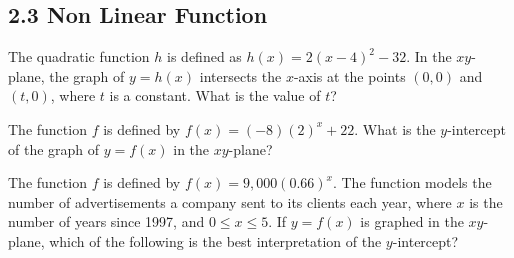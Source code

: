 \subsection*{2.3 Non Linear Function }

\vspace{0.5em}

\setcounter{questionnum}{0}

\noindent\markforreview
\vspace{1em}

The quadratic function $h$ is defined as $h(x) = 2(x - 4)^2 - 32$.  
In the $xy$-plane, the graph of $y = h(x)$ intersects the $x$-axis at the points $(0, 0)$ and $(t, 0)$, where $t$ is a constant.  
What is the value of $t$?

\vspace{0.75em}


\vspace{2em}

\noindent\markforreview
\vspace{1em}

The function $f$ is defined by $f(x) = (-8)(2)^x + 22$.  
What is the $y$-intercept of the graph of $y = f(x)$ in the $xy$-plane?

\vspace{0.75em}


\vspace{2em}
\newpage
\noindent\markforreview
\vspace{1em}

The function $f$ is defined by $f(x) = 9,\!000(0.66)^x$.  
The function models the number of advertisements a company sent to its clients each year, where $x$ is the number of years since 1997, and $0 \leq x \leq 5$.  
If $y = f(x)$ is graphed in the $xy$-plane, which of the following is the best interpretation of the $y$-intercept?

\vspace{0.75em}


